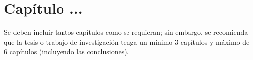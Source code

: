\chapter{Capítulo ...}
Se deben incluir tantos capítulos como se requieran; sin embargo, se recomienda que la tesis  o trabajo de investigación tenga un mínimo 3 capítulos y máximo de 6 capítulos (incluyendo las conclusiones).\\